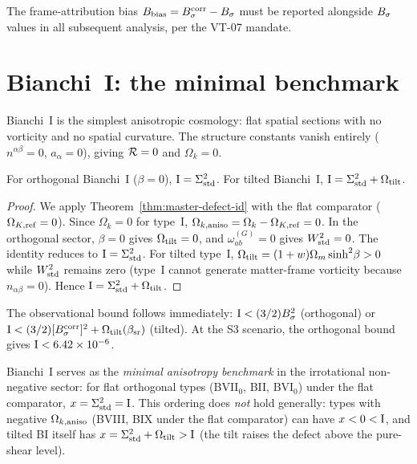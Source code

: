 The frame-attribution bias $B_{\mathrm{bias}} = B_\sigma^{\mathrm{corr}} -
B_\sigma$ must be reported alongside $B_\sigma$ values in all
subsequent analysis, per the VT-07 mandate.


\section{Bianchi~I: the minimal benchmark}\label{sec:BI}

Bianchi~I is the simplest anisotropic cosmology: flat spatial
sections with no vorticity and no spatial curvature.  The
structure constants vanish entirely ($n^{\alpha\beta} = 0$,
$a_\alpha = 0$), giving $\mathcal{R} = 0$ and $\Omega_k = 0$.

\begin{theorem}
\label{thm:BI-defect}
For orthogonal Bianchi~I ($\beta = 0$), $\mathrm{I} = \Sigma^2_{\mathrm{std}}$.
For tilted Bianchi~I, $\mathrm{I} = \Sigma^2_{\mathrm{std}} + \Omega_{\mathrm{tilt}}$.
\end{theorem}

\begin{proof}
We apply Theorem~\ref{thm:master-defect-id} with the flat
comparator ($\Omega_{K,\mathrm{ref}} = 0$).  Since $\Omega_k = 0$ for type~I,
$\Omega_{k,\mathrm{aniso}} = \Omega_k - \Omega_{K,\mathrm{ref}} = 0$.  In the orthogonal sector,
$\beta = 0$ gives $\Omega_{\mathrm{tilt}} = 0$, and $\omega_{ab}^{(G)} = 0$
gives $W^2_{\mathrm{std}} = 0$.  The identity reduces to
$\mathrm{I} = \Sigma^2_{\mathrm{std}}$.  For tilted type~I, $\Omega_{\mathrm{tilt}} =
(1+w)\Omega_m\sinh^2\!\beta > 0$ while $W^2_{\mathrm{std}}$ remains zero
(type~I cannot generate matter-frame vorticity because
$n_{\alpha\beta} = 0$).  Hence $\mathrm{I} = \Sigma^2_{\mathrm{std}} + \Omega_{\mathrm{tilt}}$.
\end{proof}

The observational bound follows immediately:
$\mathrm{I} < (3/2)B_\sigma^2$ (orthogonal) or
$\mathrm{I} < (3/2)[B_\sigma^{\mathrm{corr}}]^2 + \Omega_{\mathrm{tilt}}(\beta_{\mathrm{sr}})$
(tilted).  At the S3 scenario, the orthogonal bound gives
$\mathrm{I} < 6.42 \times 10^{-6}$.

Bianchi~I serves as the \emph{minimal anisotropy benchmark}
in the irrotational non-negative sector: for flat orthogonal
types (BVII$_0$, BII, BVI$_0$) under the flat comparator,
$x = \Sigma^2_{\mathrm{std}} = \mathrm{I}$.  This ordering does \emph{not} hold
generally: types with negative $\Omega_{k,\mathrm{aniso}}$ (BVIII, BIX under
the flat comparator) can have $x < 0 < \mathrm{I}$, and tilted BI
itself has $x = \Sigma^2_{\mathrm{std}} + \Omega_{\mathrm{tilt}} > \mathrm{I}$ (the tilt raises the
defect above the pure-shear level).

